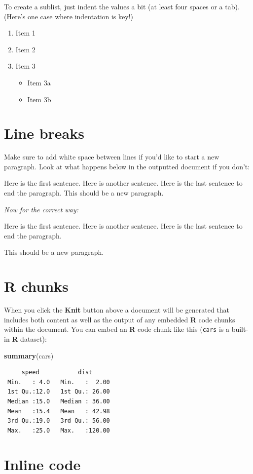 \documentclass[12pt,twoside]{deuthesis}
\newenvironment{Shaded}{\begin{snugshade}}{\end{snugshade}}
\newcommand{\FunctionTok}[1]{\textcolor[rgb]{0.13,0.29,0.53}{\textbf{#1}}}
\newcommand{\NormalTok}[1]{#1}
\providecommand{\tightlist}{%
  \setlength{\itemsep}{0pt}\setlength{\parskip}{0pt}}
\begin{document}
To create a sublist, just indent the values a bit (at least four spaces or a tab). (Here's one case where indentation is key!)
\begin{enumerate}
\def\labelenumi{\arabic{enumi}.}
\tightlist
\item
  Item 1
\item
  Item 2
\item
  Item 3
  \begin{itemize}
  \tightlist
  \item
    Item 3a
  \item
    Item 3b
  \end{itemize}
\end{enumerate}
\hypertarget{line-breaks}{%
\section{Line breaks}\label{line-breaks}}

Make sure to add white space between lines if you'd like to start a new paragraph. Look at what happens below in the outputted document if you don't:

Here is the first sentence. Here is another sentence. Here is the last sentence to end the paragraph.
This should be a new paragraph.

\emph{Now for the correct way:}

Here is the first sentence. Here is another sentence. Here is the last sentence to end the paragraph.

This should be a new paragraph.

\hypertarget{r-chunks}{%
\section{R chunks}\label{r-chunks}}

When you click the \textbf{Knit} button above a document will be generated that includes both content as well as the output of any embedded \textbf{R} code chunks within the document. You can embed an \textbf{R} code chunk like this (\texttt{cars} is a built-in \textbf{R} dataset):
\begin{Shaded}
\begin{Highlighting}[]
\FunctionTok{summary}\NormalTok{(cars)}
\end{Highlighting}
\end{Shaded}
\begin{verbatim}
     speed           dist       
 Min.   : 4.0   Min.   :  2.00  
 1st Qu.:12.0   1st Qu.: 26.00  
 Median :15.0   Median : 36.00  
 Mean   :15.4   Mean   : 42.98  
 3rd Qu.:19.0   3rd Qu.: 56.00  
 Max.   :25.0   Max.   :120.00  
\end{verbatim}
\hypertarget{inline-code}{%
\section{Inline code}\label{inline-code}}
\end{document}
